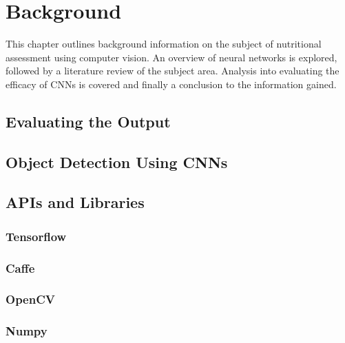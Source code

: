 \chapter{Background}
\label{background}

This chapter outlines background information on the subject of nutritional assessment using computer vision.
An overview of neural networks is explored, followed by a literature review of the subject area.
Analysis into evaluating the efficacy of CNNs is covered and finally a conclusion to the information gained.











\section{Evaluating the Output}




\section{Object Detection Using CNNs}


\section{APIs and Libraries}
\subsection*{Tensorflow}


\subsection*{Caffe}

\subsection*{OpenCV}


\subsection*{Numpy}



